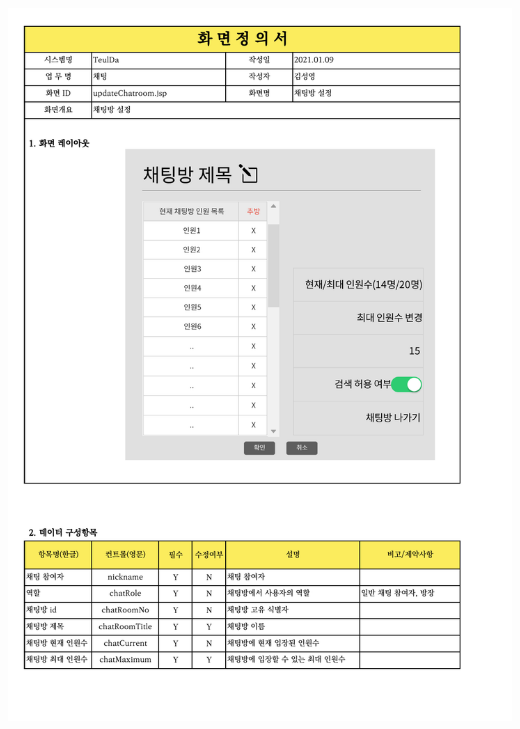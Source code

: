{{{{{{{{{{{{{{{{{{{{{{{{{{{{{{{{{{{{{{{{{{{{{{{{{{{{{{{{{{{{{{{{{{{{{\includegraphics[width=20cm]{./Figure/Analysis/Display/chat/chat_08.pdf} \\
}}}}}}}}}}}}}}}}}}}}}}}}}}}}}}}}}}}}}}}}}}}}}}}}}}}}}}}}}}}}}}}}}}}}}
